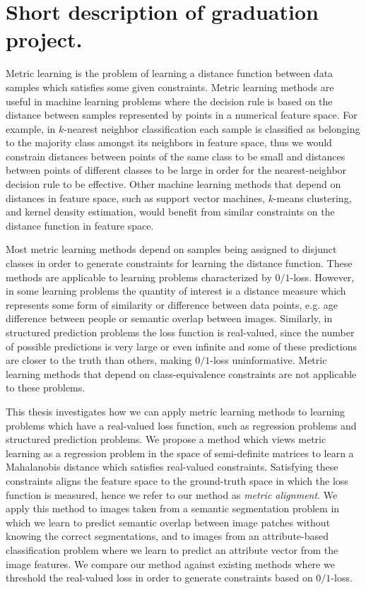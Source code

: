 
\section*{Short description of graduation project.}

Metric learning is the problem of learning a distance function between data samples which satisfies some given constraints. Metric learning methods are useful in machine learning problems where the decision rule is based on the distance between samples represented by points in a numerical feature space. For example, in $k$-nearest neighbor classification each sample is classified as belonging to the majority class amongst its neighbors in feature space, thus we would constrain distances between points of the same class to be small and distances between points of different classes to be large in order for the nearest-neighbor decision rule to be effective. Other machine learning methods that depend on distances in feature space, such as support vector machines, $k$-means clustering, and kernel density estimation, would benefit from similar constraints on the distance function in feature space.

Most metric learning methods depend on samples being assigned to disjunct classes in order to generate constraints for learning the distance function. These methods are applicable to learning problems characterized by $0/1$-loss. However, in some learning problems the quantity of interest is a distance measure which represents some form of similarity or difference between data points, e.g. age difference between people or semantic overlap between images. Similarly, in structured prediction problems the loss function is real-valued, since the number of possible predictions is very large or even infinite and some of these predictions are closer to the truth than others, making $0/1$-loss uninformative. Metric learning methods that depend on class-equivalence constraints are not applicable to these problems.

This thesis investigates how we can apply metric learning methods to learning problems which have a real-valued loss function, such as regression problems and structured prediction problems. We propose a method which views metric learning as a regression problem in the space of semi-definite matrices to learn a Mahalanobis distance which satisfies real-valued constraints. Satisfying these constraints aligns the feature space to the ground-truth space in which the loss function is measured, hence we refer to our method as \emph{metric alignment}. We apply this method to images taken from a semantic segmentation problem in which we learn to predict semantic overlap between image patches without knowing the correct segmentations, and to images from an attribute-based classification problem where we learn to predict an attribute vector from the image features. We compare our method against existing methods where we threshold the real-valued loss in order to generate constraints based on $0/1$-loss. 

